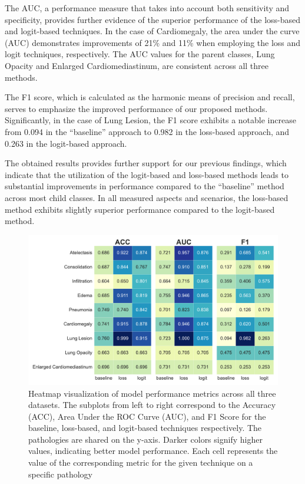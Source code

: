 \documentclass[review,1p,times,numbers]{elsarticle}
\begin{document}
The AUC, a performance measure that takes into account both sensitivity and specificity, provides further evidence of the superior performance of the loss-based and logit-based techniques. In the case of Cardiomegaly, the area under the curve (AUC) demonstrates improvements of 21\% and 11\% when employing the loss and logit techniques, respectively. The AUC values for the parent classes, Lung Opacity and Enlarged Cardiomediastinum, are consistent across all three methods.

The F1 score, which is calculated as the harmonic means of precision and recall, serves to emphasize the improved performance of our proposed methods. Significantly, in the case of Lung Lesion, the F1 score exhibits a notable increase from 0.094 in the ``baseline'' approach to 0.982 in the loss-based approach, and 0.263 in the logit-based approach.

The obtained results provides further support for our previous findings, which indicate that the utilization of the logit-based and loss-based methods leads to substantial improvements in performance compared to the ``baseline'' method across most child classes. In all measured aspects and scenarios, the loss-based method exhibits slightly superior performance compared to the logit-based method.

\begin{figure}[htbp]
    \centering
    \includegraphics[width=\textwidth]{figures/auc_acc_f1_all_datasets/ROC/metrics_AUC_ACC_F1.pdf}
    \caption[Heatmap Visualization of Model Performance Metrics (ACC, AUC, F1) for Different Techniques across Pathologies]{Heatmap visualization of model performance metrics across all three datasets. The subplots from left to right correspond to the Accuracy (ACC), Area Under the ROC Curve (AUC), and F1 Score for the baseline, loss-based, and logit-based techniques respectively. The pathologies are shared on the y-axis. Darker colors signify higher values, indicating better model performance. Each cell represents the value of the corresponding metric for the given technique on a specific pathology}\label{fig:taxonomy.fig.2.metrics}
\end{figure}
\end{document}
